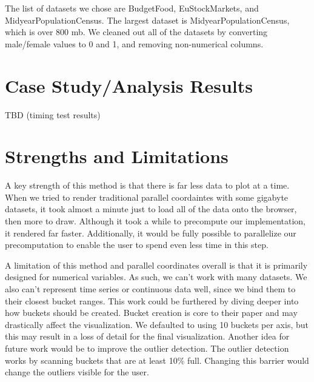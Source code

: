 \documentclass[	DIV=calc,%
			paper=a4,%
			fontsize=11pt,%
			twocolumn]{scrartcl}					%
\begin{document}
The list of datasets we chose are BudgetFood, EuStockMarkets, and MidyearPopulationCensus. The largest dataset is MidyearPopulationCensus, which is over 800 mb. We
cleaned out all of the datasets by converting male/female values to 0 and 1, and removing non-numerical columns. 

\section {Case Study/Analysis Results}
TBD (timing test results)

\section {Strengths and Limitations}
A key strength of this method is that there is far less data to plot at a time. When we tried to render traditional parallel coordaintes with some gigabyte datasets, it took almost a minute just to load all of the data onto
the browser, then more to draw. Although it took a while to precompute our implementation, it rendered far faster. Additionally, it would be fully possible to parallelize our
precomputation to enable the user to spend even less time in this step. 

A limitation of this method and parallel coordinates overall is that it is primarily designed for numerical variables. As such, we can’t work with many datasets. We also can’t represent time series or continuous data well, since we bind them to their closest bucket ranges. 
This work could be furthered by diving deeper into how buckets should be created. Bucket creation is core to their paper and may drastically affect the visualization. We defaulted to using 10 buckets per axis, but this may result in a loss of detail for the final visualization. 
Another idea for future work would be to improve the outlier detection. The outlier detection works by scanning buckets that are at least 10\% full. Changing this barrier would change the outliers visible for the user. 




\end{document}
